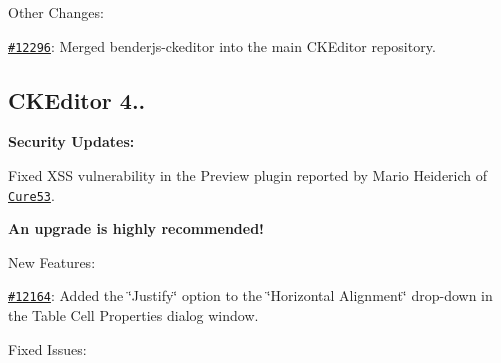 Other Changes\+:


\begin{DoxyItemize}
\item \href{http://dev.ckeditor.com/ticket/12296}{\tt \#12296}\+: Merged {\ttfamily benderjs-\/ckeditor} into the main C\+K\+Editor repository.
\end{DoxyItemize}

\subsection*{C\+K\+Editor 4..}

{\bfseries Security Updates\+:}


\begin{DoxyItemize}
\item Fixed X\+SS vulnerability in the Preview plugin reported by Mario Heiderich of \href{https://cure53.de/}{\tt Cure53}.
\end{DoxyItemize}

{\bfseries An upgrade is highly recommended!}

New Features\+:


\begin{DoxyItemize}
\item \href{http://dev.ckeditor.com/ticket/12164}{\tt \#12164}\+: Added the \char`\"{}\+Justify\char`\"{} option to the \char`\"{}\+Horizontal Alignment\char`\"{} drop-\/down in the Table Cell Properties dialog window.
\end{DoxyItemize}

Fixed Issues\+:


